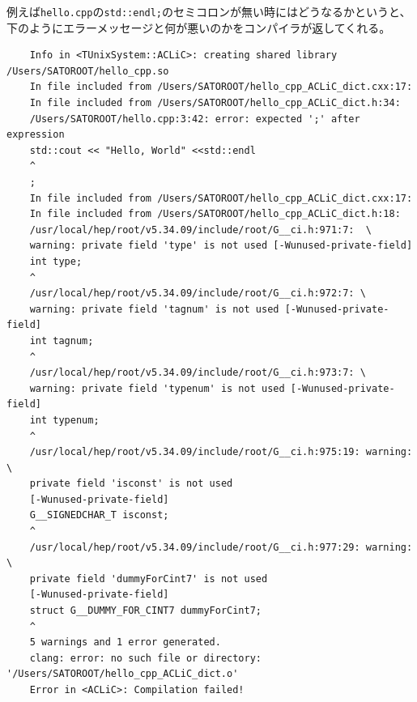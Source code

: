 \documentclass{jarticle}
\begin{document}
例えば\verb|hello.cpp|の\verb|std::endl;|のセミコロンが無い時にはどうなるかというと、
下のようにエラーメッセージと何が悪いのかをコンパイラが返してくれる。
\begin{verbatim}
	Info in <TUnixSystem::ACLiC>: creating shared library /Users/SATOROOT/hello_cpp.so
	In file included from /Users/SATOROOT/hello_cpp_ACLiC_dict.cxx:17:
	In file included from /Users/SATOROOT/hello_cpp_ACLiC_dict.h:34:
	/Users/SATOROOT/hello.cpp:3:42: error: expected ';' after expression
	std::cout << "Hello, World" <<std::endl 
	^
	;
	In file included from /Users/SATOROOT/hello_cpp_ACLiC_dict.cxx:17:
	In file included from /Users/SATOROOT/hello_cpp_ACLiC_dict.h:18:
	/usr/local/hep/root/v5.34.09/include/root/G__ci.h:971:7:  \
	warning: private field 'type' is not used [-Wunused-private-field]
	int type;
	^
	/usr/local/hep/root/v5.34.09/include/root/G__ci.h:972:7: \
	warning: private field 'tagnum' is not used [-Wunused-private-field]
	int tagnum;
	^
	/usr/local/hep/root/v5.34.09/include/root/G__ci.h:973:7: \
	warning: private field 'typenum' is not used [-Wunused-private-field]
	int typenum;
	^
	/usr/local/hep/root/v5.34.09/include/root/G__ci.h:975:19: warning: \
	private field 'isconst' is not used
	[-Wunused-private-field]
	G__SIGNEDCHAR_T isconst;
	^
	/usr/local/hep/root/v5.34.09/include/root/G__ci.h:977:29: warning: \
	private field 'dummyForCint7' is not used
	[-Wunused-private-field]
	struct G__DUMMY_FOR_CINT7 dummyForCint7;
	^
	5 warnings and 1 error generated.
	clang: error: no such file or directory: '/Users/SATOROOT/hello_cpp_ACLiC_dict.o'
	Error in <ACLiC>: Compilation failed!
\end{verbatim}


\clearpage
\end{document}
